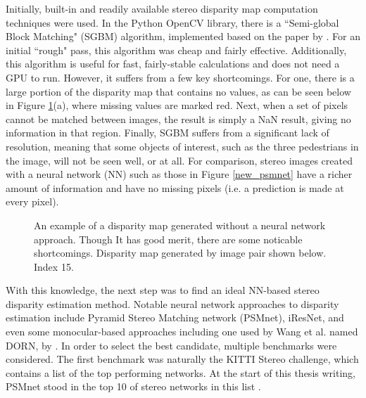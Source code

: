 Initially, built-in and readily available stereo disparity map computation techniques were used. In the Python OpenCV library, there is a ``Semi-global Block Matching" (SGBM) algorithm, implemented based on the paper by \cite{hirschmuller_stereo_2007}. For an initial ``rough" pass, this algorithm was cheap and fairly effective. Additionally, this algorithm is useful for fast, fairly-stable calculations and does not need a GPU to run. However, it suffers from a few key shortcomings. For one, there is a large portion of the disparity map that contains no values, as can be seen below in Figure \ref{ind15_SGBM_comparison}(a), where missing values are marked red. Next, when a set of pixels cannot be matched between images, the result is simply a NaN result, giving no information in that region. Finally, SGBM suffers from a significant lack of resolution, meaning that some objects of interest, such as the three pedestrians in the image, will not be seen well, or at all. For comparison, stereo images created with a neural network (NN) such as those in Figure \ref{new_psmnet} have a richer amount of information and have no missing pixels (i.e. a prediction is made at every pixel).

\begin{figure}[H]
    \centering
    \caption{An example of a disparity map generated without a neural network approach. Though It has good merit, there are some noticable shortcomings. Disparity map generated by image pair shown below. Index 15.}
    \label{ind15_SGBM_comparison}
\end{figure}

With this knowledge, the next step was to find an ideal NN-based stereo disparity estimation method. Notable neural network approaches to disparity estimation include Pyramid Stereo Matching network (PSMnet),  iResNet, and even some monocular-based approaches including one used by Wang et al. named DORN, by  \cite{fu_deep_2018}. In order to select the best candidate, multiple benchmarks were considered. The first benchmark was naturally the KITTI Stereo challenge, which contains a list of the top performing networks. At the start of this thesis writing, PSMnet stood in the top 10 of stereo networks in this list \cite{menze_kitti_2019}.


